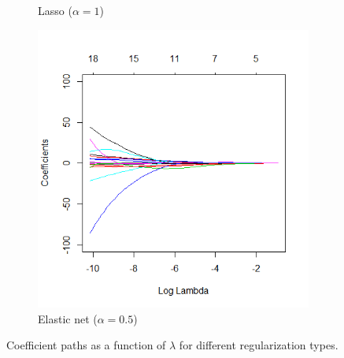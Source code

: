 \begin{figure}
\begin{subfigure}[b]{0.3\textwidth}
		\caption{Lasso ($\alpha=1$)}
		\label{fig:glm-path-lasso}
	\end{subfigure}
	\hfill
	\begin{subfigure}[b]{0.3\textwidth}
		\includegraphics[scale=0.3]{images/elastic_coefficients_path}
		\caption{Elastic net ($\alpha=0.5$)}
		\label{fig:glm-path-elastic}
	\end{subfigure}
	\caption{Coefficient paths as a function of $\lambda$ for different regularization types.}
	\label{fig:glm-paths}
\end{figure}

